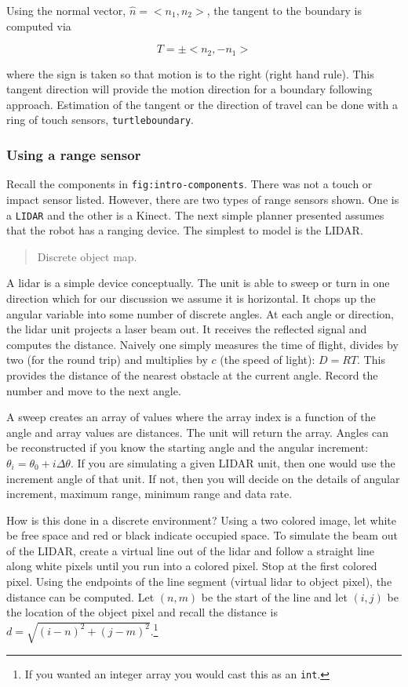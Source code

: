 Using the normal vector, \(\hat{n} = <n_1, n_2>\), the tangent to the
boundary is computed via

\[T = \pm <n_2, -n_1>\]

where the sign is taken so that motion is to the right (right hand
rule). This tangent direction will provide the motion direction for a
boundary following approach. Estimation of the tangent or the direction
of travel can be done with a ring of touch sensors,
\texttt{turtleboundary}.

\hypertarget{using-a-range-sensor}{%
\subsubsection{Using a range sensor}\label{using-a-range-sensor}}

Recall the components in \texttt{fig:intro-components}. There was not a
touch or impact sensor listed. However, there are two types of range
sensors shown. One is a \texttt{LIDAR} and the other is a Kinect. The
next simple planner presented assumes that the robot has a ranging
device. The simplest to model is the LIDAR.

\begin{quote}
Discrete object map.
\end{quote}

A lidar is a simple device conceptually. The unit is able to sweep or
turn in one direction which for our discussion we assume it is
horizontal. It chops up the angular variable into some number of
discrete angles. At each angle or direction, the lidar unit projects a
laser beam out. It receives the reflected signal and computes the
distance. Naively one simply measures the time of flight, divides by two
(for the round trip) and multiplies by \(c\) (the speed of light):
\(D = RT\). This provides the distance of the nearest obstacle at the
current angle. Record the number and move to the next angle.

A sweep creates an array of values where the array index is a function
of the angle and array values are distances. The unit will return the
array. Angles can be reconstructed if you know the starting angle and
the angular increment: \(\theta_i = \theta_0 + i\Delta\theta\). If you
are simulating a given LIDAR unit, then one would use the increment
angle of that unit. If not, then you will decide on the details of
angular increment, maximum range, minimum range and data rate.

How is this done in a discrete environment? Using a two colored image,
let white be free space and red or black indicate occupied space. To
simulate the beam out of the LIDAR, create a virtual line out of the
lidar and follow a straight line along white pixels until you run into a
colored pixel. Stop at the first colored pixel. Using the endpoints of
the line segment (virtual lidar to object pixel), the distance can be
computed. Let \((n,m)\) be the start of the line and let \((i,j)\) be
the location of the object pixel and recall the distance is
\(d = \sqrt{(i-n)^2 + (j-m)^2}\).\footnote{If you wanted an integer
  array you would cast this as an \texttt{int}.}

